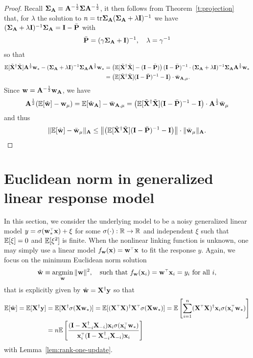 \documentclass[11pt]{article}
\begin{document}
\begin{proof}
Recall $\mathbf{\Sigma}_\mathbf A \equiv \mathbf A^{-\frac12} \mathbf{\Sigma} \mathbf A^{-\frac12}$, it then follows from Theorem~\ref{t:projection} that, for $\lambda$ the solution to $n = \mathrm{tr} \mathbf{\Sigma}_\mathbf A (\mathbf{\Sigma}_\mathbf A + \lambda \mathbf I)^{-1}$ we have $ (\mathbf{\Sigma}_\mathbf A + \lambda \mathbf I)^{-1} \mathbf{\Sigma}_\mathbf A = \mathbf I - \bar {\mathbf P} $ with
\[
  \bar {\mathbf P} = (\gamma \mathbf{\Sigma}_\mathbf A + \mathbf I)^{-1}, \quad \lambda = \gamma^{-1}
\]
so that
\begin{align*}
  \mathbb E[\tilde {\mathbf X}^\dagger \tilde {\mathbf X}] \mathbf A^{\frac12} \mathbf w_* - (\mathbf{\Sigma}_\mathbf A + \lambda \mathbf I)^{-1} \mathbf{\Sigma}_\mathbf A \mathbf A^{\frac12} \mathbf w_* &= \left( \mathbb E[\tilde {\mathbf X}^\dagger \tilde {\mathbf X}] - (\mathbf I - \bar {\mathbf P}) \right) (\mathbf I - \bar {\mathbf P})^{-1} \cdot (\mathbf{\Sigma}_\mathbf A + \lambda \mathbf I)^{-1} \mathbf{\Sigma}_\mathbf A \mathbf A^{\frac12} \mathbf w_* \\
  &= \left( \mathbb E[\tilde {\mathbf X}^\dagger \tilde {\mathbf X}] (\mathbf I - \bar {\mathbf P})^{-1} - \mathbf I  \right) \cdot \bar {\mathbf w}_{\mathbf A,\mu}.
\end{align*}
Since $\mathbf w = \mathbf A^{-\frac12} \mathbf w_\mathbf A$, we have
\begin{align*}
  \mathbf A^{\frac12} ( \mathbb E[\hat {\mathbf w}] - \mathbf w_\mu ) = \mathbb E[\hat {\mathbf w}_\mathbf A] - \bar {\mathbf w}_{\mathbf A,\mu} = \left( \mathbb E[\tilde {\mathbf X}^\dagger \tilde {\mathbf X}] (\mathbf I - \bar {\mathbf P})^{-1} - \mathbf I  \right) \cdot \mathbf A^{\frac12} \bar {\mathbf w}_\mu
\end{align*}
and thus
\[
  \| \mathbb E[\hat {\mathbf w}] - \bar {\mathbf w}_\mu \|_\mathbf A \le \left\| \left( \mathbb E[\tilde {\mathbf X}^\dagger \tilde {\mathbf X}] (\mathbf I - \bar {\mathbf P})^{-1} - \mathbf I  \right) \right\| \cdot \| \bar {\mathbf w}_\mu \|_\mathbf A.
\]
\end{proof}

\section{Euclidean norm in generalized linear response model}

In this section, we consider the underlying model to be a noisy generalized linear model $y = \sigma(\w_*^\top \x) + \xi$ for some $\sigma(\cdot): \mathbb R \to \mathbb R$ and independent $\xi$ such that $\mathbb E[\xi] = 0$ and $\mathbb E[\xi^2]$ is finite. When the nonlinear linking function is unknown, one may simply use a linear model $f_\w(\x) = \w^\top \x$ to fit the response $y$. Again, we focus on the minimum Euclidean norm solution
\[
  \hat \w \equiv \argmin_\w \| \w \|^2, \quad \textmd{such that $f_\w(\x_i) = \w^\top \x_i = y_i$ for all $i$},
\]
that is explicitly given by $\hat {\mathbf w} = \mathbf X^\dagger \mathbf y$ so that 
\begin{align*}
  \E[\hat \w] = \E[\X^\dagger \y] &= \E[\X^\dagger \sigma(\X \w_*)] = \E[(\X^\top \X)^\dagger \X^\top \sigma(\X \w_*)] = \E \left[ \sum_{i=1}^n (\X^\top \X)^\dagger \x_i \sigma(\x_i^\top \w_*) \right] \\ 
  &= n \E\left[\frac{(\I - \X_{-i}^\dagger \X_{-i}) \x_i \sigma(\x_i^\top \w_*)}{\x_i^\top (\I - \X_{-i}^\dagger \X_{-i}) \x_i} \right]
\end{align*}
with Lemma~\ref{lem:rank-one-update}.
\end{document}
